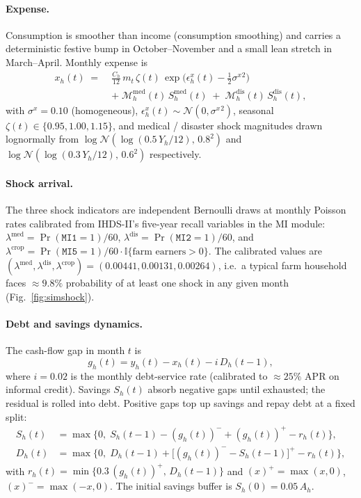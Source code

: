 \documentclass[colorlinks,balance]{asmeconf}
\begin{document}
\paragraph{Expense.} Consumption is smoother than income (consumption smoothing) and carries a deterministic festive bump in October--November and a small lean stretch in March--April. Monthly expense is
\begin{equation}\label{eq:x}
\begin{aligned}
x_h(t) \;=\;& \frac{C_h}{12}\, m_t \, \zeta(t)\, \exp\!\Big(\epsilon^x_h(t) - \tfrac{1}{2}\sigma^{x}{}^2\Big) \\
            &+\; \mathcal{M}^{\text{med}}_h(t)\, S^{\text{med}}_h(t)\;+\; \mathcal{M}^{\text{dis}}_h(t)\, S^{\text{dis}}_h(t),
\end{aligned}
\end{equation}
with $\sigma^x \!=\! 0.10$ (homogeneous), $\epsilon^x_h(t) \!\sim\! \mathcal{N}(0, \sigma^{x}{}^2)$, seasonal $\zeta(t) \!\in\! \{0.95, 1.00, 1.15\}$, and medical / disaster shock magnitudes drawn lognormally from $\log\mathcal{N}(\log(0.5\, Y_h/12),\, 0.8^2)$ and $\log\mathcal{N}(\log(0.3\, Y_h/12),\, 0.6^2)$ respectively.

\paragraph{Shock arrival.} The three shock indicators are independent Bernoulli draws at monthly Poisson rates calibrated from IHDS-II's five-year recall variables in the MI module: $\lambda^{\text{med}} \!=\! \Pr(\texttt{MI1}=1)/60$, $\lambda^{\text{dis}} \!=\! \Pr(\texttt{MI2}=1)/60$, and $\lambda^{\text{crop}} \!=\! \Pr(\texttt{MI5}=1)/60 \!\cdot\! \mathbb{I}\{\text{farm earners} > 0\}$. The calibrated values are $(\lambda^{\text{med}}, \lambda^{\text{dis}}, \lambda^{\text{crop}}) = (0.00441, 0.00131, 0.00264)$, i.e.\ a typical farm household faces $\approx 9.8\%$ probability of at least one shock in any given month (Fig.~\ref{fig:simshock}).

\paragraph{Debt and savings dynamics.} The cash-flow gap in month $t$ is
\begin{equation}\label{eq:gap}
g_h(t) = y_h(t) - x_h(t) - i\, D_h(t\!-\!1),
\end{equation}
where $i = 0.02$ is the monthly debt-service rate (calibrated to $\approx 25\%$ APR on informal credit). Savings $S_h(t)$ absorb negative gaps until exhausted; the residual is rolled into debt. Positive gaps top up savings and repay debt at a fixed split:
\begin{align}
    S_h(t) &= \max\!\big\{0,\; S_h(t\!-\!1) - (g_h(t))^{-} + (g_h(t))^{+} - r_h(t)\big\}, \label{eq:S} \\
    D_h(t) &= \max\!\big\{0,\; D_h(t\!-\!1) + \big[(g_h(t))^{-} - S_h(t\!-\!1)\big]^{+} - r_h(t)\big\}, \label{eq:D}
\end{align}
with $r_h(t) = \min\{0.3\,(g_h(t))^{+},\, D_h(t\!-\!1)\}$ and $(x)^{+} \!=\! \max(x,0)$, $(x)^{-} \!=\! \max(-x,0)$. The initial savings buffer is $S_h(0) = 0.05\, A_h$.
\end{document}
